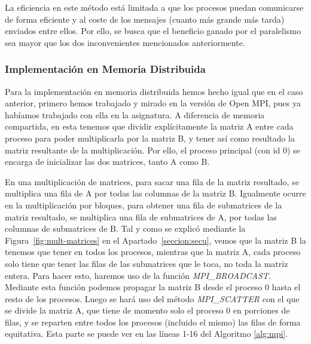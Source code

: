 \documentclass[a4paper,12pt]{article}
\begin{document}
La eficiencia en este método está limitada a que los procesos puedan comunicarse de forma eficiente y al coste de los mensajes (cuanto más grande más tarda) enviados entre ellos. Por ello, se busca que el beneficio ganado por el paralelismo sea mayor que los dos inconvenientes mencionados anteriormente.

\subsubsection{Implementación en Memoria Distribuida}

Para la implementación en memoria distribuida hemos hecho igual que en el caso anterior, primero hemos trabajado y mirado en la versión de Open MPI, pues ya habíamos trabajado con ella en la asignatura. A diferencia de memoria compartida, en esta tenemos que dividir explícitamente la matriz A entre cada proceso para poder multiplicarla por la matriz B, y tener así como resultado la matriz resultante de la multiplicación. Por ello, el proceso principal (con id 0) se encarga de inicializar las dos matrices, tanto A como B. 

En una multiplicación de matrices, para sacar una fila de la matriz resultado, se multiplica una fila de A por todas las columnas de la matriz B. Igualmente ocurre en la multiplicación por bloques, para obtener una fila de submatrices de la matriz resultado, se multiplica una fila de submatrices de A, por todas las columnas de submatrices de B. Tal y como se explicó mediante la Figura~\ref{fig:mult-matrices} en el Apartado~\ref{seccion:secu}, vemos que la matriz B la tenemos que tener en todos los procesos, mientras que la matriz A, cada proceso solo tiene que tener las filas de las submatrices que le toca, no toda la matriz entera. Para hacer esto, haremos uso de la función {\it MPI\_BROADCAST}. Mediante esta función podemos propagar la matriz B desde el proceso 0 hasta el resto de los procesos. Luego se hará uso del método {\it MPI\_SCATTER} con el que se divide la matriz A, que tiene de momento solo el proceso 0 en porciones de filas, y se reparten entre todos los procesos (incluido el mismo) las filas de forma equitativa. Esta parte se puede ver en las líneas 1-16 del Algoritmo \ref{alg:mpi}.
\end{document}
